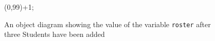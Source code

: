 \documentclass{article}
\begin{document}
\begin {figure}


\Draw


\IntVar \counter

\Table {}

\myTable(0,99){\counter+1;}
    
\WriteVal \counter

\EndDraw

\caption {An object diagram showing the value of the
variable \texttt {roster} after three Students have been
added}

\label {fig:ArrayList3}

\end {figure}
\end{document}
